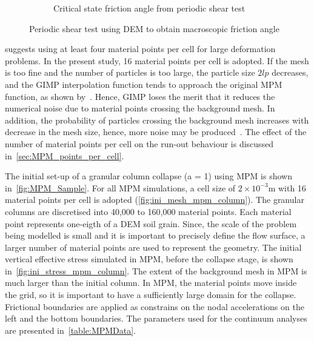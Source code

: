 \begin{figure}
\begin{subfigure}[b]{0.575\textwidth}
\caption{Critical state friction angle from periodic shear test}
\label{fig:Sxy_vs_Syy}
\end{subfigure} 
\caption{Periodic shear test using DEM to obtain macroscopic friction angle}
\label{fig:shear_test}
\end{figure}

\citet{Guilkey2003} suggests using at least four material points per cell for 
large deformation problems. In the present study, 16 material points 
per cell is adopted. If the mesh is too fine and the number of particles is too 
large, the particle size $2lp$ decreases, and the GIMP interpolation 
function tends to approach the original MPM function, as shown 
by~\citet{Bardenhagen2004}. Hence, GIMP loses the merit that it reduces the 
numerical noise due to material points crossing the background mesh. In 
addition, the probability of particles crossing the background mesh increases 
with decrease in the mesh size, hence, more noise may be 
produced~\citep{Abe2013}. The effect of the number of material points per cell 
on the run-out behaviour is discussed in~\cref{sec:MPM_points_per_cell}.

The initial set-up of a granular column collapse (a = 1) using MPM is shown 
in~\cref{fig:MPM_Sample}. For all MPM simulations, a cell size of 
$2\times10^{-3}\si{\m}$ with 16 material points per cell is adopted 
(\cref{fig:ini_mesh_mpm_column}). The granular columns are
discretised into 40,000 to 160,000 material points. Each material point 
represents one-eigth of a DEM soil grain. Since, the scale of the problem being 
modelled is small and it is important to precisely define the flow surface, a 
larger number of material points are used to represent the geometry. The 
initial vertical effective stress 
simulated in MPM, before the collapse stage, is shown 
in~\cref{fig:ini_stress_mpm_column}. The extent of the 
background mesh in MPM is much larger than the initial column. In MPM, the 
material points move inside the grid, so it is important to have a sufficiently 
large domain for the collapse. Frictional boundaries are applied as constrains 
on the nodal accelerations on the left and the bottom boundaries. The 
parameters used for the continuum analyses are presented 
in~\cref{table:MPMData}. 

